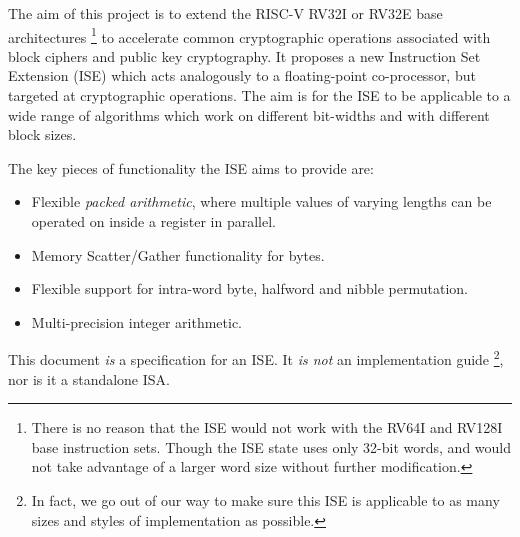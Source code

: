 

The aim of this project is to
extend the RISC-V RV32I or RV32E base architectures \footnote{
 There is no reason that the ISE would not work with the
 RV64I and RV128I base instruction sets. Though the ISE state
 uses only 32-bit words, and would not take advantage of a
 larger word size without further modification.
} to accelerate common cryptographic
operations associated with block ciphers and public key cryptography.
It proposes a new Instruction Set Extension (ISE)
which acts analogously to a floating-point co-processor,
but targeted at cryptographic operations.
The aim is for the ISE to be applicable to a wide range of algorithms
which work on different bit-widths and with different block sizes.

The key pieces of functionality the ISE aims to provide are:

\begin{itemize}
\item Flexible {\em packed arithmetic}, where multiple values of varying
    lengths can be operated on inside a register in parallel.
\item Memory Scatter/Gather functionality for bytes.
\item Flexible support for intra-word byte, halfword and nibble
      permutation.
\item Multi-precision integer arithmetic.
\end{itemize}

This document {\em is} a specification for an ISE. It {\em is not} an
implementation guide \footnote{In fact, we go out of our way to make sure this
ISE is applicable to as many sizes and styles of implementation as possible.},
nor is it a standalone ISA.
